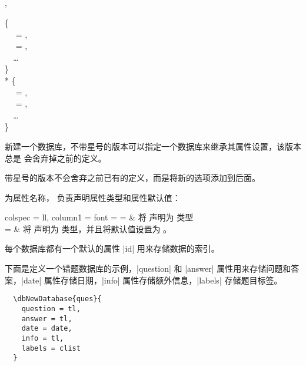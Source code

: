 \documentclass[full]{l3doc}
\begin{document}
\begin{documentation}
\subsection{}
\begin{function}{\dbNewDatabase, \dbNewDatabase*}
  \begin{syntax}
       \{ \\
    ~~ = , \\
    ~~ = , \\
    ~~\ldots{} \\
    \} \\
    *  \{ \\
    ~~ = , \\
    ~~ = , \\
    ~~\ldots{} \\
    \} \\
  \end{syntax}

\end{function}

  新建一个数据库，不带星号的版本可以指定一个数据库来继承其属性设置，该版本总是
  会舍弃掉之前的定义。

  带星号的版本不会舍弃之前已有的定义，而是将新的选项添加到后面。

   为属性名称， 负责声明属性类型和属性默认值：

  \noindent\begin{tblr}{
    colspec = {ll},
    column{1} = {font = \ttfamily}
  }
     =  &
    将  声明为  类型 \\
     = \textbar{} &
    将  声明为  类型，并且将默认值设置为 。
    \\
  \end{tblr}

  \begin{note}
    每个数据库都有一个默认的属性 |id| 用来存储数据的索引。
  \end{note}

  下面是定义一个错题数据库的示例，|question| 和 |answer| 属性用来存储问题和答
  案，|date| 属性存储日期，|info| 属性存储额外信息，|labels| 存储题目标签。
\begin{verbatim}
  \dbNewDatabase{ques}{
    question = tl,
    answer = tl,
    date = date,
    info = tl,
    labels = clist
  }
\end{verbatim}


\end{documentation}
\end{document}
